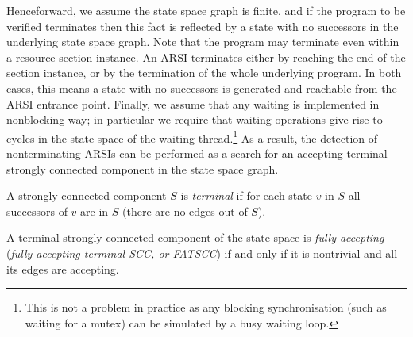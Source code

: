Henceforward, we assume the state space graph is finite, and if the program to
be verified terminates then this fact is reflected by a state with no
successors in the underlying state space graph. Note that the program may
terminate even within a resource section instance. An ARSI terminates either by
reaching the end of the section instance, or by the termination of the whole
underlying program. In both cases, this means a state with no successors is
generated and reachable from the ARSI entrance point.
Finally, we assume that any waiting is implemented in nonblocking way; in
particular we require that waiting operations give rise to cycles in the state
space of the waiting thread.\footnote{This is not a problem in practice as any
    blocking synchronisation (such as waiting for a mutex) can be simulated by a
    busy waiting loop.}
As a result, the detection
of nonterminating ARSIs can be performed as a search for an accepting terminal
strongly connected component in the state space graph.


\begin{definition}
A strongly connected component $S$ is \emph{terminal}\footnotemark{} if for each state $v$ in $S$ all successors of $v$ are in $S$ (there are no edges out of $S$).

\end{definition}

\begin{definition}
A terminal strongly connected component of the state space is \emph{fully
  accepting} (\emph{fully accepting terminal SCC, or FATSCC}) if and only if it is nontrivial and all its edges are accepting.
\end{definition}


